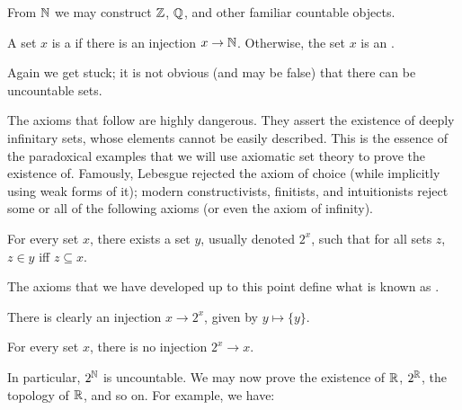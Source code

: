 \begin{subsec}
From $\mathbb{N}$ we may construct $\mathbb{Z}$, $\mathbb{Q}$, and other familiar countable objects.
\end{subsec}

\begin{definition}
A set $x$ is a  if there is an injection $x \to \mathbb{N}$.
Otherwise, the set $x$ is an .
\end{definition}

\begin{subsec}
Again we get stuck; it is not obvious (and may be false) that there can be uncountable sets.
\end{subsec}

\begin{subsec}
The axioms that follow are highly dangerous. They assert the existence of deeply infinitary sets, whose elements cannot be easily described.
This is the essence of the paradoxical examples that we will use axiomatic set theory to prove the existence of.
Famously, Lebesgue rejected the axiom of choice (while implicitly using weak forms of it); modern constructivists, finitists, and intuitionists reject some or all of the following axioms (or even the axiom of infinity).
\end{subsec}

\begin{axiom}
For every set $x$, there exists a set $y$, usually denoted $2^x$, such that for all sets $z$, $z \in y$ iff $z \subseteq x$.
\end{axiom}

\begin{subsec}
The axioms that we have developed up to this point define what is known as .
\end{subsec}

\begin{subsec}
There is clearly an injection $x \to 2^x$, given by $y \mapsto \{y\}$.
\end{subsec}

\begin{theorem}
For every set $x$, there is no injection $2^x \to x$.
\end{theorem}

\begin{subsec}
In particular, $2^{\mathbb{N}}$ is uncountable.
We may now prove the existence of $\mathbb{R}$, $2^{\mathbb{R}}$, the topology of $\mathbb{R}$, and so on. For example, we have:
\end{subsec}

